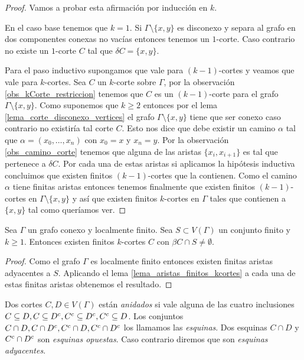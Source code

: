 \documentclass[tesis.tex]{subfiles}
\begin{document}
\begin{proof}
	Vamos a probar esta afirmación por inducción en $k$.
	
	En el caso base tenemos que $k=1$. 
	Si $\Gamma \setminus \{x,y\}$ es disconexo y separa al grafo en dos componentes conexas no vacías entonces tenemos un $1$-corte. 
	Caso contrario no existe un $1$-corte $C$ tal que $\delta C = \{x,y\}$.
	
	Para el paso inductivo supongamos que vale para $(k-1)$-cortes y veamos que vale para $k$-cortes.
	Sea $C$ un $k$-corte sobre $\Gamma$, por la observación \ref{obs_kCorte_restriccion} tenemos que $C$ es un $(k-1)$-corte para el grafo $\Gamma \setminus \{x,y\}$.
	Como suponemos que $k \ge 2$ entonces por el lema \ref{lema_corte_disconexo_vertices} el grafo $\Gamma \setminus \{x,y\}$ tiene que ser conexo caso contrario no existiría tal corte $C$.
	Esto nos dice que debe existir un camino $\alpha$ tal que $\alpha = (x_{0}, \dots, x_{n})$ con $x_{0} = x$ y $x_{n} = y$.
	Por la observación \ref{obs_camino_corte} tenemos que alguna de las aristas $\{x_{i},x_{i+1}\}$ es tal que pertenece a $\delta C$.
	Por cada una de estas aristas si aplicamos la hipótesis inductiva concluimos que existen finitos $(k-1)$-cortes que la contienen.
	Como el camino $\alpha$ tiene finitas aristas entonces tenemos finalmente que existen finitos $(k-1)$-cortes en $\Gamma \setminus \{x,y\}$ y así que existen finitos $k$-cortes en $\Gamma$ tales que contienen a $\{x,y\}$ tal como queríamos ver.
	
\end{proof}




\begin{coro}\label{lema_finitos_kcortes}
	Sea $\Gamma$ un grafo conexo y localmente finito.
	Sea $S \subset V(\Gamma)$ un conjunto finito y $k\ge 1$.
	Entonces existen finitos $k$-cortes $C$ con $\beta C \cap S \neq \emptyset$.
\end{coro}	

\begin{proof}
	Como el grafo $\Gamma$ es localmente finito entonces existen finitas aristas adyacentes a $S$.
	Aplicando el lema \ref{lema_aristas_finitos_kcortes} a cada una de estas finitas aristas obtenemos el resultado.	
\end{proof}
	





\begin{deff}
	Dos cortes $C,D \in V(\Gamma)$ están \emph{anidados} si vale alguna de las cuatro inclusiones $C \subseteq D, C \subseteq D^{c}, C^{c} \subseteq D^{c}, C^{c} \subseteq D$.
	Los conjuntos $C \cap D, C \cap D^{c}, C^{c} \cap D, C^{c} \cap D^{c}$ los llamamos las \emph{esquinas}.
	Dos esquinas $C \cap D$ y $C^{c} \cap D^{c}$ son \emph{esquinas opuestas}.
	Caso contrario diremos que son \emph{esquinas adyacentes}.
\end{deff}
\end{document}
